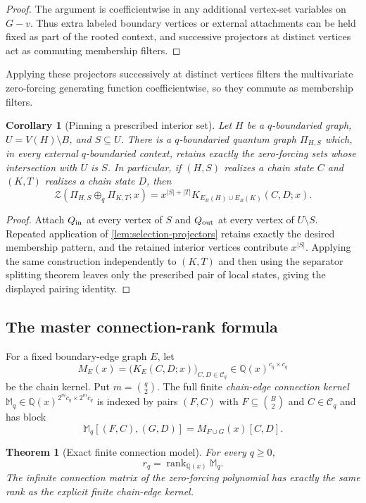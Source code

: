 \documentclass[11pt,reqno]{amsart}
\newtheorem{theorem}{Theorem}[section]
\newtheorem{corollary}[corollary]{Corollary}
\theoremstyle{definition}
\newcommand{\Zpoly}{\mathcal Z}
\begin{document}
\begin{proof}
The argument is coefficientwise in any additional vertex-set variables on
$G-v$.  Thus extra labeled boundary vertices or external attachments can be
held fixed as part of the rooted context, and successive projectors at
distinct vertices act as commuting membership filters.
\end{proof}

Applying these projectors successively at distinct vertices filters the
multivariate zero-forcing generating function coefficientwise, so they commute
as membership filters.

\begin{corollary}[Pinning a prescribed interior set]\label{cor:pinning}
Let $H$ be a $q$-boundaried graph, $U=V(H)\setminus B$, and
$S\subseteq U$.  There is a $q$-boundaried quantum graph $\Pi_{H,S}$ which, in every
external $q$-boundaried context, retains exactly the zero-forcing sets whose
intersection with $U$ is $S$.  In particular, if $(H,S)$ realizes a chain
state $C$ and $(K,T)$ realizes a chain state $D$, then
\[
 \Zpoly(\Pi_{H,S}\oplus_q\Pi_{K,T};x)
 =x^{|S|+|T|}K_{E_B(H)\cup E_B(K)}(C,D;x).
\]
\end{corollary}

\begin{proof}
Attach $Q_{\rm in}$ at every vertex of $S$ and $Q_{\rm out}$ at every vertex
of $U\setminus S$.  Repeated application of
\cref{lem:selection-projectors} retains exactly the desired membership
pattern, and the retained interior vertices contribute $x^{|S|}$.  Applying
the same construction independently to $(K,T)$ and then using the separator
splitting theorem leaves only the prescribed pair of local states, giving the
displayed pairing identity.
\end{proof}

\subsection{The master connection-rank formula}

For a fixed boundary-edge graph $E$, let
\[
  M_E(x)=\bigl(K_E(C,D;x)\bigr)_{C,D\in\mathcal C_q}
  \in\mathbb Q(x)^{c_q\times c_q}
\]
be the chain kernel.  Put $m=\binom q2$.  The full finite
\emph{chain-edge connection kernel}
$\mathbb M_q\in\mathbb Q(x)^{2^m c_q\times 2^m c_q}$ is indexed by pairs
$(F,C)$ with $F\subseteq\binom B2$ and $C\in\mathcal C_q$ and has block
\[
 \mathbb M_q[(F,C),(G,D)]=M_{F\cup G}(x)[C,D].
\]

\begin{theorem}[Exact finite connection model]\label{thm:finite-connection-model}
For every $q\ge0$,
\[
 \boxed{
 r_q=\operatorname{rank}_{\mathbb Q(x)}\mathbb M_q.
 }
\]
The infinite connection matrix of the zero-forcing polynomial has exactly
the same rank as the explicit finite chain-edge kernel.
\end{theorem}
\end{document}
